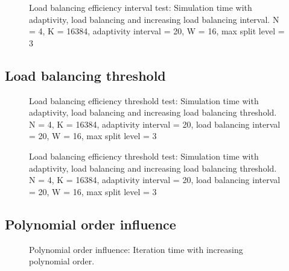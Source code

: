 \begin{figure}[H]
	\centering
	
	\caption{Load balancing efficiency interval test: Simulation time with adaptivity, load balancing and increasing load balancing interval. N = 4, K = 16384, adaptivity interval = 20, W = 16, max split level = 3}
	\label{fig:load_balancing_efficiency_interval}
\end{figure}

\subsection{Load balancing threshold} \label{subsection:results:load_balancing_performance:threshold}

\begin{figure}[H]
	\centering
	
	\caption{Load balancing efficiency threshold test: Simulation time with adaptivity, load balancing and increasing load balancing threshold. N = 4, K = 16384, adaptivity interval = 20, load balancing interval = 20, W = 16, max split level = 3}
	\label{fig:load_balancing_efficiency_threshold_s3}
\end{figure}

\begin{figure}[H]
	\centering
	
	\caption{Load balancing efficiency threshold test: Simulation time with adaptivity, load balancing and increasing load balancing threshold. N = 4, K = 16384, adaptivity interval = 20, load balancing interval = 20, W = 16, max split level = 3}
	\label{fig:load_balancing_efficiency_threshold_s5}
\end{figure}

\subsection{Polynomial order influence} \label{subsection:results:load_balancing_performance:polynomial_order}

\begin{figure}[H]
	\centering
	
	\caption{Polynomial order influence: Iteration time with increasing polynomial order.}
	\label{fig:N_influence}
\end{figure}

